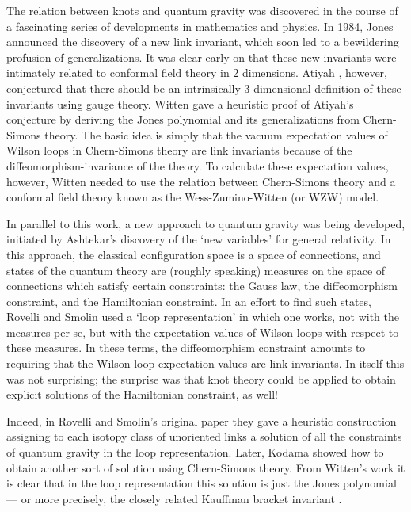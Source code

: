The relation between knots and quantum gravity was discovered in the
course of a fascinating series of developments in mathematics and
physics.  In 1984, Jones \cite{Jones} announced the discovery of a new
link invariant, which soon led to a bewildering profusion of
generalizations.  It was clear early on that these new invariants were
intimately related to conformal field theory in 2 dimensions.  Atiyah
\cite{Atiyah0}, however, conjectured that there should be an
intrinsically 3-dimensional definition of these invariants using gauge
theory.  Witten \cite{Witten2} gave a heuristic proof of Atiyah's
conjecture by deriving the Jones polynomial and its generalizations from
Chern-Simons theory.  The basic idea is simply that the vacuum
expectation values of Wilson loops in Chern-Simons theory are link
invariants because of the diffeomorphism-invariance of the theory.  To
calculate these expectation values, however, Witten needed to use the
relation between Chern-Simons theory and a conformal field theory known
as the Wess-Zumino-Witten (or WZW) model.

In parallel to this work, a new approach to quantum gravity was being
developed, initiated by Ashtekar's \cite{Ashtekar} discovery of the `new
variables' for general relativity.  In this approach, the classical
configuration space is a space of connections, and states of the quantum
theory are (roughly speaking) measures on the space of connections which
satisfy certain constraints: the Gauss law, the diffeomorphism
constraint, and the Hamiltonian constraint.  In an effort to find such
states, Rovelli and Smolin \cite{RS} used a `loop representation' in
which one works, not with the measures per se, but with the expectation
values of Wilson loops with respect to these measures.  In these terms,
the diffeomorphism constraint amounts to requiring that the Wilson loop
expectation values are link invariants.  In itself this was not
surprising; the surprise was that knot theory could be applied to
obtain explicit solutions of the Hamiltonian constraint, as well!

Indeed, in Rovelli and Smolin's original paper they gave a heuristic
construction assigning to each isotopy class of unoriented links a
solution of all the constraints of quantum gravity in the loop
representation.  Later, Kodama \cite{Kodama} showed how to obtain
another sort of solution using Chern-Simons theory.  From Witten's work
it is clear that in the loop representation this solution is just the
Jones polynomial --- or more precisely, the closely related Kauffman
bracket invariant \cite{Kauffman}.

